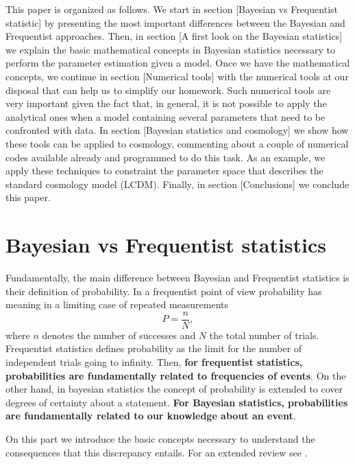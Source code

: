 \documentclass[onecolumn,           %
               showpacs,            %
               preprintnumbers,     %
               aps,                 %
               prl,          	    %
               letterpaper,             %
               superscriptaddress,      %
               nofootinbib,         %
               tightenlines,        %
               floats,floatfix      %
               ,usenatbib,
               ]{revtex4-1}
\begin{document}
This paper is organized as follows. We start in section [Bayesian vs Frequentist statistic] by presenting the most important differences between the Bayesian and Frequentist approaches. Then, in section [A first look on the Bayesian statistics] we explain the basic mathematical concepts in Bayesian statistics necessary to perform the parameter estimation given a model. Once we have the mathematical concepts, we continue in section [Numerical tools] with the numerical tools at our disposal that can help us to simplify our homework. Such numerical tools are very important given the fact that, in general, it is not possible to apply the analytical ones when a model containing several parameters that need to be confronted with data. In section [Bayesian statistics and cosmology] we show how these tools can be applied to cosmology, commenting about a couple of numerical codes available already and programmed to do this task. As an example, we apply these techniques to constraint the parameter space that describes the standard cosmology model (LCDM). Finally, in section [Conclusions] we conclude this paper.

\section{Bayesian vs Frequentist statistics}

Fundamentally, the main difference between Bayesian and Frequentist statistics is their definition of probability. In a frequentist point of view probability has meaning in a limiting case of repeated measurements
\begin{equation}
P=\frac{n}{N},
\end{equation}
where $n$ denotes the number of successes and $N$ the total number of trials. Frequentist statistics defines probability as the limit for the number of independent trials going to infinity. Then, \textbf{for frequentist statistics, probabilities are fundamentally related to frequencies of events}. On the other hand, in bayesian statistics the concept of probability is extended to cover degrees of certainty about a statement. \textbf{For Bayesian statistics, probabilities are fundamentally related to our knowledge about an event}.

On this part we introduce the basic concepts necessary to understand the consequences that this discrepancy entails. For an extended review see \cite{bayeslecture, AlanH, RobT, LiV, RobTr}. 
\end{document}
